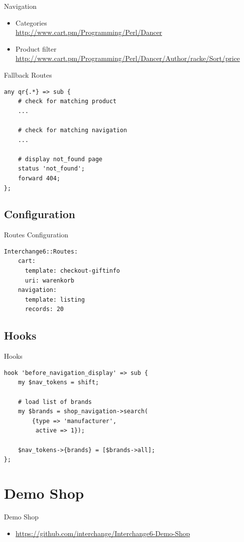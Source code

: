 \begin{frame}{Navigation}
\begin{itemize}
\item Categories \\
\url{http://www.cart.pm/Programming/Perl/Dancer}
\item Product filter \\
\url{http://www.cart.pm/Programming/Perl/Dancer/Author/racke/Sort/price}
\end{itemize}
\end{frame}

\begin{frame}[fragile]{Fallback Routes}
\begin{lstlisting}
any qr{.*} => sub {
    # check for matching product
    ...

    # check for matching navigation
    ...

    # display not_found page
    status 'not_found';
    forward 404;
};
\end{lstlisting}
\end{frame}

\subsection{Configuration}
\begin{frame}[fragile]{Routes Configuration}
\begin{lstlisting}
Interchange6::Routes:
    cart:
      template: checkout-giftinfo
      uri: warenkorb
    navigation:
      template: listing
      records: 20
\end{lstlisting}
\end{frame}

\subsection{Hooks}
\begin{frame}[fragile]{Hooks}
\begin{lstlisting}
hook 'before_navigation_display' => sub {
    my $nav_tokens = shift;

    # load list of brands
    my $brands = shop_navigation->search(
        {type => 'manufacturer',
         active => 1});

    $nav_tokens->{brands} = [$brands->all];
};
\end{lstlisting}
\end{frame}

\section{Demo Shop}
\begin{frame}{Demo Shop}
\begin{itemize}
\item  \url{https://github.com/interchange/Interchange6-Demo-Shop}
\end{itemize}
\end{frame}

